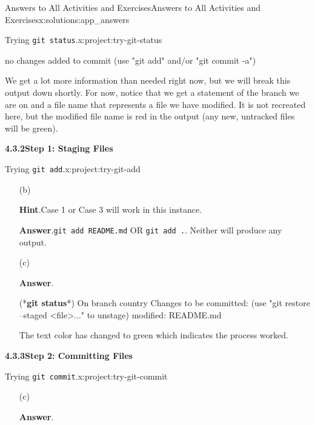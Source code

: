 \documentclass[oneside,10pt,]{book}
\newcommand{\blocktitlefont}{\relax}
\newcommand{\mono}[1]{\texttt{#1}}
\newcommand{\consoleinput}[1]{\textbf{#1}}
\begin{document}
\begin{solutions-chapter}{Answers to All Activities and Exercises}{}{Answers to All Activities and Exercises}{}{}{x:solutions:app_answers}
\begin{projectsolution}{4.4}{Trying \mono{git status}.}{x:project:try-git-status}
\begin{console}{0}{1}{0}
no changes added to commit (use "git add" and/or "git commit -a")
\end{console}
We get a lot more information than needed right now, but we will break this output down shortly. For now, notice that we get a statement of the branch we are on and a file name that represents a file we have modified. It is not recreated here, but the modified file name is red in the output (any new, untracked files will be green).%
\end{projectsolution}%
\par\medskip
\noindent\textbf{\Large{}4.3.2\space\textperiodcentered\space{}Step 1: Staging Files}
\begin{projectsolution}{4.5}{Trying \mono{git add}.}{x:project:try-git-add}%
\begin{enumerate}[font=\bfseries,label=(\alph*),ref=\alph*]
\item[(b)]\par\smallskip%
\noindent\textbf{\blocktitlefont Hint}.\hypertarget{g:hint:idp616225416-back}{}\quad{}Case 1 or Case 3 will work in this instance.%
\par\smallskip%
\noindent\textbf{\blocktitlefont Answer}.\hypertarget{g:answer:idp616231816-back}{}\quad{}\mono{git add README.md} OR \mono{git add .}. Neither will produce any output.%
\item[(c)]\par\smallskip%
\noindent\textbf{\blocktitlefont Answer}.\hypertarget{g:answer:idp616229896-back}{}\quad{}\begin{console}{0}{1}{0}
(*\consoleinput{git status}*)
On branch country
Changes to be committed:
  (use "git restore --staged <file>..." to unstage)
        modified:   README.md
\end{console}
The text color has changed to green which indicates the process worked.%
\end{enumerate}
\end{projectsolution}%
\par\medskip
\noindent\textbf{\Large{}4.3.3\space\textperiodcentered\space{}Step 2: Committing Files}
\begin{projectsolution}{4.6}{Trying \mono{git commit}.}{x:project:try-git-commit}%
\begin{enumerate}[font=\bfseries,label=(\alph*),ref=\alph*]
\item[(c)]\par\smallskip%
\noindent\textbf{\blocktitlefont Answer}.\hypertarget{g:answer:idp616243848-back}{}\quad{}\begin{console}{0}{1}{0}

\end{console}
\end{enumerate}
\end{projectsolution}
\end{solutions-chapter}
\end{document}
